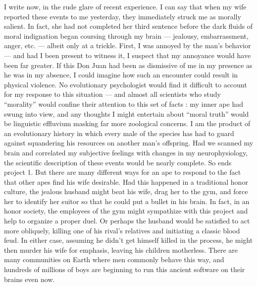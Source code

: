 \documentclass[a4paper,14pt]{extarticle}
\begin{document}
I write now, in the rude glare of recent experience.
I can say that when my wife reported these events to me yesterday, they immediately struck me as morally salient.
In fact, she had not completed her third sentence before the dark fluids of moral indignation began coursing through my brain --- jealousy, embarrassment, anger, etc. --- albeit only at a trickle.
First, I was annoyed by the man's behavior --- and had I been present to witness it, I suspect that my annoyance would have been far greater.
If this Don Juan had been as dismissive of me in my presence as he was in my absence, I could imagine how such an encounter could result in physical violence.
No evolutionary psychologist would find it difficult to account for my response to this situation --- and almost all scientists who study ``morality'' would confine their attention to this set of facts :
my inner ape had swung into view, and any thoughts I might entertain about ``moral truth'' would be linguistic effluvium masking far more zoological concerns.
I am the product of an evolutionary history in which every male of the species has had to guard against squandering his resources on another man's offspring.
Had we scanned my brain and correlated my subjective feelings with changes in my neurophysiology, the scientific description of these events would be nearly complete.
So ends project 1.
But there are many different ways for an ape to respond to the fact that other apes find his wife desirable.
Had this happened in a traditional honor culture, the jealous husband might beat his wife, drag her to the gym, and force her to identify her suitor so that he could put a bullet in his brain.
In fact, in an honor society, the employees of the gym might sympathize with this project and help to organize a proper duel.
Or perhaps the husband would be satisfied to act more obliquely, killing one of his rival's relatives and initiating a classic blood feud.
In either case, assuming he didn't get himself killed in the process, he might then murder his wife for emphasis, leaving his children motherless.
There are many communities on Earth where men commonly behave this way, and hundreds of millions of boys are beginning to run this ancient software on their brains even now.
\end{document}
